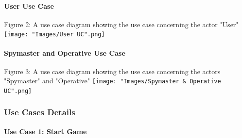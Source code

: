\documentclass[10pt, a4paper]{article}
\begin{document}
		    \clearpage
		
			\paragraph{User Use Case}
			
			\begin{center}
				Figure 2: A use case diagram showing the use case concerning the actor "User"
				\texttt{[image: "Images/User UC".png]}
			\end{center} 
			
			\paragraph{Spymaster and Operative Use Case}
			
			\begin{center}
				Figure 3: A use case diagram showing the use case concerning the actors "Spymaster" and "Operative"
				\texttt{[image: "Images/Spymaster \& Operative UC".png]}
			\end{center}
		\pagebreak
		\subsubsection{Use Cases Details}
		
			\paragraph{Use Case 1: Start Game }
			
\end{document}
